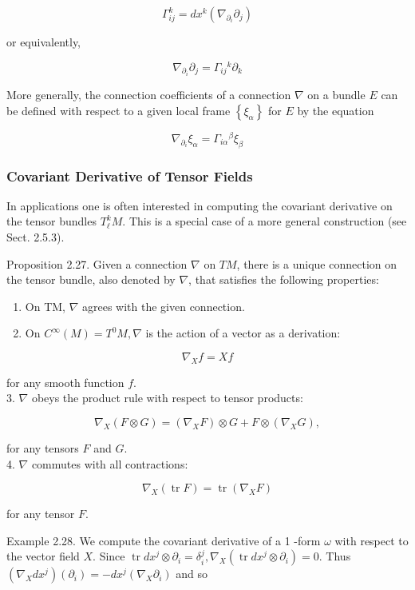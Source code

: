\documentclass[10pt, letterpaper]{article}
\begin{document}
$$
\Gamma_{i j}^{k}=d x^{k}\left(\nabla_{\partial_{i}} \partial_{j}\right)
$$

or equivalently,

$$
\nabla_{\partial_{i}} \partial_{j}=\Gamma_{i j}{ }^{k} \partial_{k}
$$

More generally, the connection coefficients of a connection $\nabla$ on a bundle $E$ can be defined with respect to a given local frame $\left\{\xi_{\alpha}\right\}$ for $E$ by the equation

$$
\nabla_{\partial_{i}} \xi_{\alpha}=\Gamma_{i \alpha}{ }^{\beta} \xi_{\beta}
$$

\subsubsection*{Covariant Derivative of Tensor Fields}
In applications one is often interested in computing the covariant derivative on the tensor bundles $T_{\ell}^{k} M$. This is a special case of a more general construction (see Sect. 2.5.3).

Proposition 2.27. Given a connection $\nabla$ on $T M$, there is a unique connection on the tensor bundle, also denoted by $\nabla$, that satisfies the following properties:

\begin{enumerate}
  \item On TM, $\nabla$ agrees with the given connection.
  \item On $C^{\infty}(M)=T^{0} M, \nabla$ is the action of a vector as a derivation:
\end{enumerate}

$$
\nabla_{X} f=X f
$$

for any smooth function $f$.\\
3. $\nabla$ obeys the product rule with respect to tensor products:

$$
\nabla_{X}(F \otimes G)=\left(\nabla_{X} F\right) \otimes G+F \otimes\left(\nabla_{X} G\right),
$$

for any tensors $F$ and $G$.\\
4. $\nabla$ commutes with all contractions:

$$
\nabla_{X}(\operatorname{tr} F)=\operatorname{tr}\left(\nabla_{X} F\right)
$$

for any tensor $F$.

Example 2.28. We compute the covariant derivative of a 1 -form $\omega$ with respect to the vector field $X$. Since $\operatorname{tr} d x^{j} \otimes \partial_{i}=\delta_{i}^{j}, \nabla_{X}\left(\operatorname{tr} d x^{j} \otimes \partial_{i}\right)=0$. Thus $\left(\nabla_{X} d x^{j}\right)\left(\partial_{i}\right)=-d x^{j}\left(\nabla_{X} \partial_{i}\right)$ and so
\end{document}
